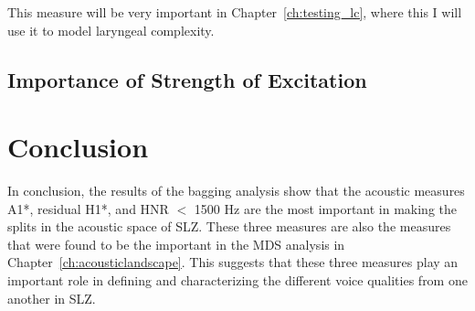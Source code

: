 This measure will be very important in Chapter~\ref{ch:testing_lc}, where this I will use it to model laryngeal complexity.

\subsection{Importance of Strength of Excitation} \label{sec:dt_soe}

\section{Conclusion} \label{sec:bagging_conclusion}

In conclusion, the results of the bagging analysis show that the acoustic measures A1*, residual H1*, and HNR $<$ 1500 Hz are the most important in making the splits in the acoustic space of SLZ. These three measures are also the measures that were found to be the important in the MDS analysis in Chapter~\ref{ch:acousticlandscape}. This suggests that these three measures play an important role in defining and characterizing the different voice qualities from one another in SLZ. 

